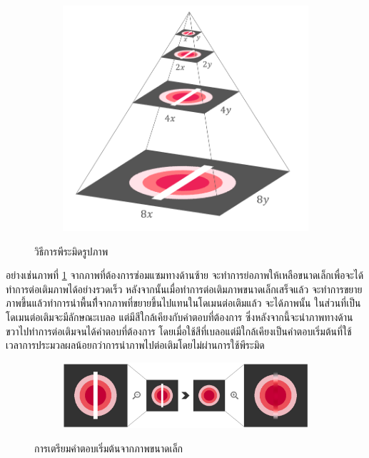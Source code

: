\documentclass[hidelinks, a4paper,12pt]{article}
\numberwithin{equation}{section}							%
\numberwithin{equation}{section}
\begin{document}
{	 	\begin{figure}[H]
	 	\centering
	 	\begin{subfigure}{0.4\linewidth}
	 		\centering
	 		\includegraphics[width=0.8\linewidth]{images/image_inpaint_synthetic/image_pyramid.png}
	 	\end{subfigure}
 		 \caption{วิธีการพีระมิดรูปภาพ}
	 \end{figure}
 	\hspace{1cm} อย่างเช่นภาพที่ \ref{image:intialsolution} จากภาพที่ต้องการซ่อมแซมทางด้านซ้าย จะทำการย่อภาพให้เหลือขนาดเล็กเพื่อจะได้ทำการต่อเติมภาพได้อย่างรวดเร็ว หลังจากนั้นเมื่อทำการต่อเติมภาพขนาดเล็กเสร็จแล้ว จะทำการขยายภาพขึ้นแล้วทำการนำพื้นทีี่จากภาพที่ขยายขึ้นไปแทนในโดเมนต่อเติมแล้ว จะได้ภาพนั้น ในส่วนที่เป็นโดเมนต่อเติมจะมีลักษณะเบลอ แต่มีสีใกล้เคียงกับคำตอบที่ต้องการ  ซึ่งหลังจากนี้จะนำภาพทางด้านขวาไปทำการต่อเติมจนได้คำตอบที่ต้องการ โดยเมื่อใช้สีที่เบลอแต่มีใกล้เคียงเป็นคำตอบเริ่มต้นที่ใช้เวลาการประมวลผลน้อยกว่าการนำภาพไปต่อเติมโดยไม่ผ่านการใช้พีระมิด
	 \begin{figure}[H]
	 	\centering
	 	\begin{subfigure}{1\linewidth}
	 		\centering
	 		\includegraphics[width=0.8\linewidth]{images/image_inpaint_synthetic/image_inital_solution.png}
	 	\end{subfigure}
	 	\caption{การเตรียมคำตอบเริ่มต้นจากภาพขนาดเล็ก}
	 	\label{image:intialsolution}
	 \end{figure}
	
}
\end{document}
